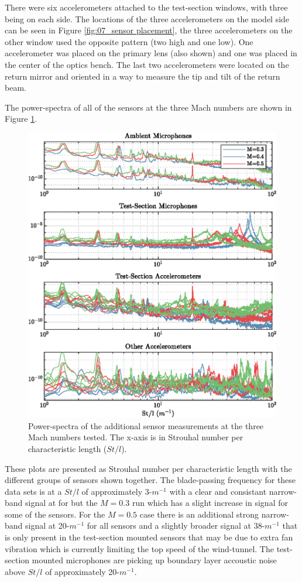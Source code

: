 There were six accelerometers attached to the test-section windows, with three being on each side.
The locations of the three accelerometers on the model side can be seen in Figure \ref{fig:07_sensor placement}, the three accelerometers on the other window used the opposite pattern (two high and one low).
One accelerometer was placed on the primary lens (also shown) and one was placed in the center of the optics bench.
The last two accelerometers were located on the return mirror and oriented in a way to measure the tip and tilt of the return beam.

The power-spectra of all of the sensors at the three Mach numbers are shown in Figure \ref{fig:07_sensor_spectra}.
\begin{figure}
  \centering
  \includegraphics{../matlab/07_multiple_sensor_filtering/sensor_spectra.eps}
  \caption{Power-spectra of the additional sensor measurements at the three Mach numbers tested. The x-axis is in Strouhal number per characteristic length ($St/l$).}
  \label{fig:07_sensor_spectra}
\end{figure}
These plots are presented as Strouhal number per characteristic length with the different groups of sensors shown together.
The blade-passing frequency for these data sets is at a $St/l$ of approximately 3-$m^{-1}$ with a clear and consistant narrow-band signal at for but the $M=0.3$ run which has a slight increase in signal for some of the sensors.
For the $M=0.5$ case there is an additional strong narrow-band signal at 20-$m^{-1}$ for all sensors and a slightly broader signal at 38-$m^{-1}$ that is only present in the test-section mounted sensors that may be due to extra fan vibration which is currently limiting the top speed of the wind-tunnel.
The test-section mounted microphones are picking up boundary layer accoustic noise above $St/l$ of approximately 20-$m^{-1}$.

